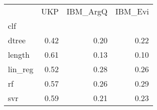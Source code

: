 \begin{tabular}{lrrr}
\toprule
{} &   UKP &  IBM\_ArgQ &  IBM\_Evi \\
clf     &       &           &          \\
\midrule
dtree   &  0.42 &      0.20 &     0.22 \\
length  &  0.61 &      0.13 &     0.10 \\
lin\_reg &  0.52 &      0.28 &     0.26 \\
rf      &  0.57 &      0.26 &     0.29 \\
svr     &  0.59 &      0.21 &     0.23 \\
\bottomrule
\end{tabular}
